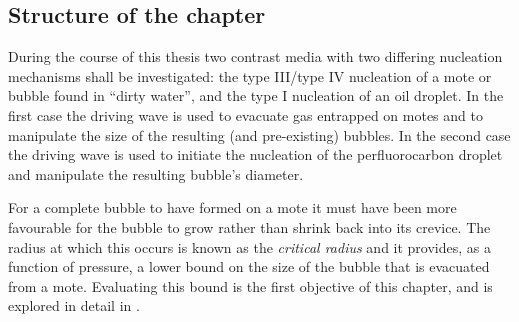 
\subsection{Structure of the chapter}


During the course of this thesis two contrast media with two differing nucleation mechanisms shall be investigated:
the type III/type IV nucleation of a mote or bubble found in ``dirty water'',
and the type I nucleation of an oil droplet.
In the first case the driving wave is used to evacuate gas entrapped on motes
and to manipulate the size of the resulting (and pre-existing) bubbles.
In the second case the driving wave is used to initiate the nucleation of the perfluorocarbon droplet
and manipulate the resulting bubble's diameter.

For a complete bubble to have formed on a mote it must have been more favourable
for the bubble to grow rather than shrink back into its crevice.
The radius at which this occurs is known as the {\em critical radius}
and it provides, as a function of pressure,  a lower bound on the size of the bubble that is evacuated from a mote.
Evaluating this bound is the first objective of this chapter,
and is explored in detail in .


